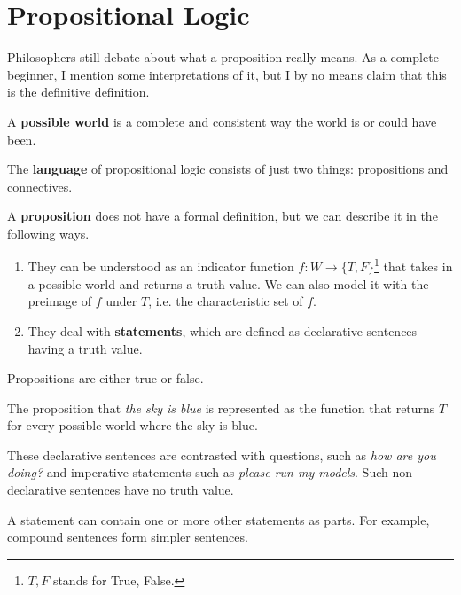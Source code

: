 \section{Propositional Logic} 

  Philosophers still debate about what a proposition really means. As a complete beginner, I mention some interpretations of it, but I by no means claim that this is the definitive definition. 

  \begin{definition}
    A \textbf{possible world} is a complete and consistent way the world is or could have been. 
  \end{definition} 

  The \textbf{language} of propositional logic consists of just two things: propositions and connectives. 

  \begin{definition}[Proposition]
    A \textbf{proposition} does not have a formal definition, but we can describe it in the following ways.  
    \begin{enumerate}
      \item They can be understood as an indicator function $f: W \rightarrow \{T, F\}$\footnote{$T, F$ stands for True, False.} that takes in a possible world and returns a truth value. We can also model it with the preimage of $f$ under $T$, i.e. the characteristic set of $f$. 
      \item They deal with \textbf{statements}, which are defined as declarative sentences having a truth value. 
    \end{enumerate} 
    Propositions are either true or false. 
  \end{definition}

  \begin{example}
    The proposition that \textit{the sky is blue} is represented as the function that returns $T$ for every possible world where the sky is blue. 
  \end{example}

  These declarative sentences are contrasted with questions, such as \textit{how are you doing?} and imperative statements such as \textit{please run my models}. Such non-declarative sentences have no truth value. 

  A statement can contain one or more other statements as parts. For example, compound sentences form simpler sentences. 

